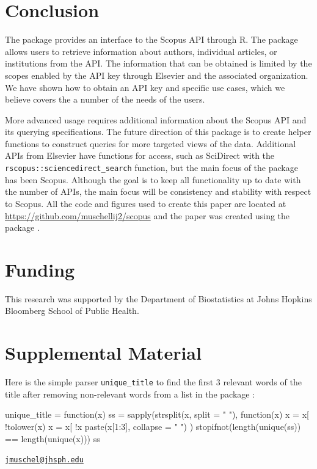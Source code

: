 \hypertarget{conclusion}{%
\section{Conclusion}\label{conclusion}}

The  package provides an interface to the Scopus API
through R. The package allows users to retrieve information about
authors, individual articles, or institutions from the API. The
information that can be obtained is limited by the scopes enabled by the
API key through Elsevier and the associated organization. We have shown
how to obtain an API key and specific use cases, which we believe covers
the a number of the needs of the users.

More advanced usage requires additional information about the Scopus API
and its querying specifications. The future direction of this package is
to create helper functions to construct queries for more targeted views
of the data. Additional APIs from Elsevier have functions for access,
such as SciDirect with the \texttt{rscopus::sciencedirect\_search}
function, but the main focus of the package has been Scopus. Although
the goal is to keep all functionality up to date with the number of
APIs, the main focus will be consistency and stability with respect to
Scopus. All the code and figures used to create this paper are located
at \url{https://github.com/muschellij2/scopus} and the paper was created
using the  package \citep{rticles}.

\hypertarget{funding}{%
\section{Funding}\label{funding}}

This research was supported by the Department of Biostatistics at Johns
Hopkins Bloomberg School of Public Health.

\hypertarget{supplemental-material}{%
\section{Supplemental Material}\label{supplemental-material}}

Here is the simple parser \texttt{unique\_title} to find the first 3
relevant words of the title after removing non-relevant words from a
list in the  package \citep{stopwords}:

\begin{Schunk}
\begin{Sinput}
unique_title = function(x) {
  ss = sapply(strsplit(x, split = " "), 
              function(x) {
                x = x[ !tolower(x) %
                x = x[ !x %
                paste(x[1:3], collapse = " ")
              })
  stopifnot(length(unique(ss)) == length(unique(x)))
  ss
}
\end{Sinput}
\end{Schunk}



\address{%
John Muschelli\\
Department of Biostatistics, Johns Hopkins Bloomberg School of Public
Health\\
615 N Wolfe St Baltimore, MD 21205\\
}
\href{mailto:jmuschel@jhsph.edu}{\nolinkurl{jmuschel@jhsph.edu}}

